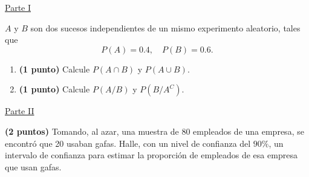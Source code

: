 
\noindent\underline{Parte I}

$A$ y $B$ son dos sucesos independientes de un mismo experimento aleatorio, tales que
\[
P(A)=0.4,\quad P(B)=0.6.
\]
\begin{enumerate}[label=\alph*)]
\item \textbf{(1 punto)} Calcule $P(A\cap B)$ y $P(A\cup B)$.
\item \textbf{(1 punto)} Calcule $P(A/B)$ y $P(B/A^C)$.
\end{enumerate}
\par\noindent\begin{minipage}{\linewidth}
\noindent\underline{Parte II}

\textbf{(2 puntos)} Tomando, al azar, una muestra de 80 empleados de una empresa, se encontró que 20 usaban gafas. Halle, con un nivel de confianza del $90\%$, un intervalo de confianza para estimar la proporción de empleados de esa empresa que usan gafas.
\end{minipage}\par
